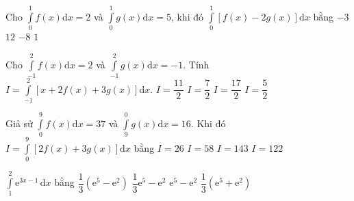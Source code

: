 \begin{ex}%
 Cho $\displaystyle\int\limits_{0}^{1}f(x)\mathrm{d}x=2$ và $\displaystyle\int\limits_{0}^{1}g(x)\mathrm{d}x=5$, khi đó $\displaystyle\int\limits_{0}^{1}\left[f(x)-2g(x)\right]\mathrm{d}x$ bằng
	\choice
	{ $-3$}
	{$12$}
	{\True $-8$}
	{$1$}
\end{ex}
\begin{ex}%
	 Cho $\displaystyle\int\limits_{-1}^{2}f(x)\mathrm{d}x=2$ và $\displaystyle\int\limits_{-1}^{2}g(x)\mathrm{d}x=-1$. Tính $I=\displaystyle\int\limits_{-1}^{2}\left[x+2f(x)+3g(x)\right]\mathrm{d}x$.
	\choice
	{ $I=\dfrac{11}{2}$}
	{$I=\dfrac{7}{2}$}
	{$I=\dfrac{17}{2}$}
	{\True $I=\dfrac{5}{2}$}
\end{ex}
\begin{ex}%
Giả sử $\displaystyle\int\limits_{0}^{9}f(x)\mathrm{d}x=37$ và $\displaystyle\int\limits_{9}^{0}g(x)\mathrm{d}x=16$. Khi đó $I=\displaystyle\int\limits_{0}^{9}\left[2f(x)+3g(x)\right]\mathrm{d}x$ bằng
	\choice
	{\True $I=26$}
	{$I=58$}
	{$I=143$}
	{$I=122$}
\end{ex}
\begin{ex}%
	$\displaystyle\int\limits_1^2 \mathrm{e}^{3x-1} \mathrm{\, d}x$ bằng
	\choice
	{\True $\dfrac{1}{3}(\mathrm{e}^5-\mathrm{e}^2)$}
	{$\dfrac{1}{3}\mathrm{e}^5-\mathrm{e}^2$}
	{$\mathrm{e}^5-\mathrm{e}^2$}
	{$\dfrac{1}{3}(\mathrm{e}^5+\mathrm{e}^2)$}
\end{ex}
